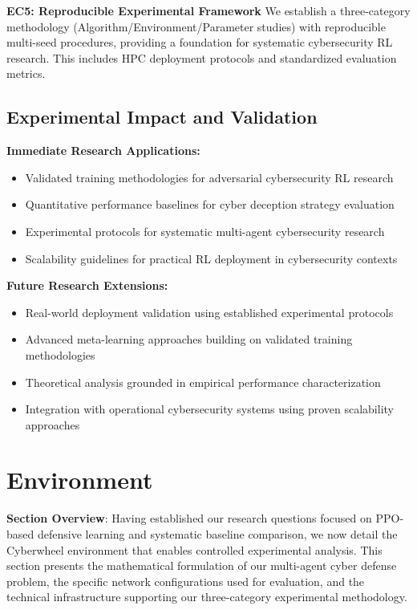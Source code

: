 \documentclass[12pt,twoside]{article}
\theoremstyle{definition}
\theoremstyle{plain}
\begin{document}
\textbf{EC5: Reproducible Experimental Framework}
We establish a three-category methodology (Algorithm/Environment/Parameter studies) with reproducible multi-seed procedures, providing a foundation for systematic cybersecurity RL research. This includes HPC deployment protocols and standardized evaluation metrics.

\subsection{Experimental Impact and Validation}

\textbf{Immediate Research Applications:}
\begin{itemize}
\item Validated training methodologies for adversarial cybersecurity RL research
\item Quantitative performance baselines for cyber deception strategy evaluation  
\item Experimental protocols for systematic multi-agent cybersecurity research
\item Scalability guidelines for practical RL deployment in cybersecurity contexts
\end{itemize}

\textbf{Future Research Extensions:}
\begin{itemize}
\item Real-world deployment validation using established experimental protocols
\item Advanced meta-learning approaches building on validated training methodologies
\item Theoretical analysis grounded in empirical performance characterization
\item Integration with operational cybersecurity systems using proven scalability approaches
\end{itemize}

\section{Environment}

\textbf{Section Overview}: Having established our research questions focused on PPO-based defensive learning and systematic baseline comparison, we now detail the Cyberwheel environment that enables controlled experimental analysis. This section presents the mathematical formulation of our multi-agent cyber defense problem, the specific network configurations used for evaluation, and the technical infrastructure supporting our three-category experimental methodology.
\end{document}
